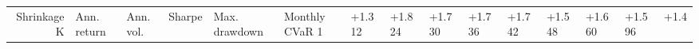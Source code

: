 \begin{tabular}{rlllllll}
\toprule
Shrinkage K & Ann. return & Ann. vol. & Sharpe & Max. drawdown & Monthly CVaR 1%
 & +1.3%
12 & +1.8%
24 & +1.7%
30 & +1.7%
36 & +1.7%
42 & +1.5%
48 & +1.6%
60 & +1.5%
96 & +1.4%
\bottomrule
\end{tabular}
